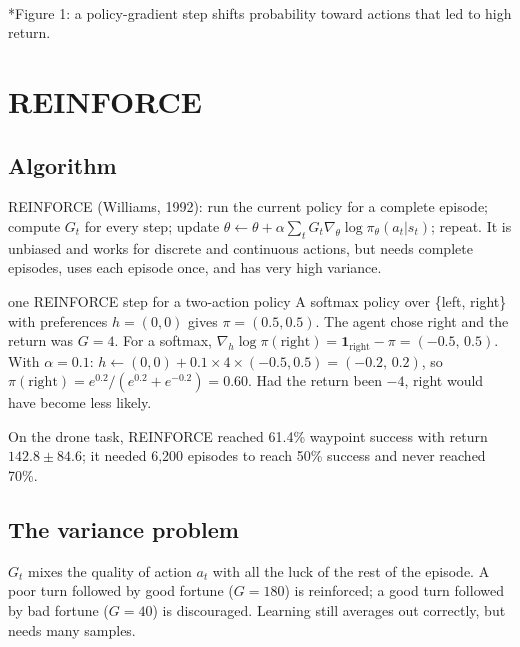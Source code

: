 \documentclass[11pt]{article}
\begin{document}
\begin{center}\\*{\small\color{GreyN}Figure 1: a policy-gradient step shifts probability toward actions that led to high return.}\end{center}

\section{REINFORCE}
\subsection{Algorithm}
REINFORCE (Williams, 1992): run the current policy for a complete episode; compute $G_t$ for every step; update $\theta\leftarrow\theta+\alpha\sum_tG_t\nabla_\theta\log\pi_\theta(a_t|s_t)$; repeat. It is unbiased and works for discrete and continuous actions, but needs complete episodes, uses each episode once, and has very high variance.
\begin{example}{one REINFORCE step for a two-action policy}
A softmax policy over \{left, right\} with preferences $h=(0,0)$ gives $\pi=(0.5,0.5)$. The agent chose right and the return was $G=4$. For a softmax, $\nabla_h\log\pi(\text{right})=\mathbf 1_{\text{right}}-\pi=(-0.5,\,0.5)$. With $\alpha=0.1$: $h\leftarrow(0,0)+0.1\times4\times(-0.5,0.5)=(-0.2,\,0.2)$, so $\pi(\text{right})=e^{0.2}/(e^{0.2}+e^{-0.2})=0.60$. Had the return been $-4$, right would have become less likely.
\end{example}
On the drone task, REINFORCE reached 61.4\% waypoint success with return $142.8\pm84.6$; it needed 6,200 episodes to reach 50\% success and never reached 70\%.

\subsection{The variance problem}
$G_t$ mixes the quality of action $a_t$ with all the luck of the rest of the episode. A poor turn followed by good fortune ($G=180$) is reinforced; a good turn followed by bad fortune ($G=40$) is discouraged. Learning still averages out correctly, but needs many samples.
\end{document}
